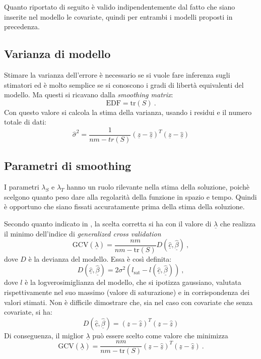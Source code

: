 \documentclass[a4paper,11pt,twoside,openright]{book}							%
\begin{document}
Quanto riportato di seguito è valido indipendentemente dal fatto che siano inserite nel modello le covariate, quindi per entrambi i modelli proposti in precedenza.

\subsection{Varianza di modello}
Stimare la varianza dell'errore è necessario se si vuole fare inferenza sugli stimatori ed è molto semplice se si conoscono i gradi di libertà equivalenti del modello. Ma questi si ricavano dalla \textit{smoothing matrix}:
$$
\mathrm{EDF}=\mathrm{tr}(S) \ .
$$
Con questo valore si calcola la stima della varianza, usando i residui e il numero totale di dati:
$$
\hat{\sigma}^2=\frac{1}{nm-tr(S)}(\underline z - \hat  {\underline z})^T(\underline z - \hat  {\underline z})
$$

\subsection{Parametri di smoothing}
I parametri $\lambda_S$ e $\lambda_T$ hanno un ruolo rilevante nella stima della soluzione, poichè scelgono quanto peso dare alla regolarità della funzione in spazio e tempo. Quindi è opportuno che siano fissati accuratamente prima della stima della soluzione.

Secondo quanto indicato in \cite{art:marra}, la scelta corretta si ha con il valore di $\underline \lambda$ che realizza il minimo dell'indice di \textit{generalized cross validation}
$$
\mathrm{GCV}(\underline \lambda) =\frac{nm}{nm-\text{tr}(S)}  D(\hat  {\underline c},\hat  {\underline \beta}) \ ,
$$
dove $D$ è la devianza del modello. Essa è così definita:
$$
D(\hat  {\underline c},\hat  {\underline \beta})=2\sigma^2(l_{\mathrm{sat}}-l(\hat  {\underline c},\hat  {\underline \beta})) \ ,
$$
dove $l$ è la logverosimiglianza del modello, che si ipotizza gaussiano, valutata rispettivamente nel suo massimo (valore di saturazione) e in corrispondenza dei valori stimati. Non è difficile dimostrare che, sia nel caso con covariate che senza covariate, si ha: 
$$
D(\hat  {\underline c},\hat  {\underline \beta}) = (\underline z - \hat  {\underline z})^T(\underline z - \hat  {\underline z})
$$
Di conseguenza, il miglior $\underline \lambda$ può essere scelto come valore che minimizza
\begin{equation}
\label{eq:GCV}
\mathrm{GCV}(\underline \lambda) =\frac{nm}{nm-\text{tr}(S)}  (\underline z - \hat  {\underline z})^T(\underline z - \hat  {\underline z}) \ .
\end{equation}
\end{document}
